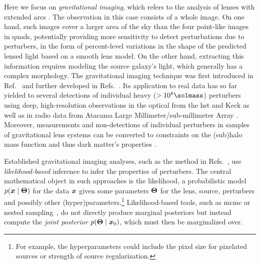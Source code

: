 Here we focus on \emph{gravitational imaging}, which refers to the analysis of lenses with extended arcs \cite{Koopmans:2005ig,Vegetti:2008eg,Vegetti:2009gw}. The observation in this case consists of a whole image. On one hand, such images cover a larger area of the sky than the four point-like images in quads, potentially providing more sensitivity to detect perturbations due to perturbers, in the form of percent-level variations in the shape of the predicted lensed light based on a smooth lens model. On the other hand, extracting this information requires modeling the source galaxy's light, which generally has a complex morphology. The gravitational imaging technique was first introduced in Ref.~\cite{Koopmans:2005nr} and further developed in Refs.~\cite{Vegetti:2008eg, Vegetti:2009gw}. Its application to real data has so far yielded to several detections of individual heavy ($>10^8 \si{\solmass}$) perturbers using deep, high-resolution observations in the optical from the \gls*{hst} and Keck as well as in radio data from Atacama Large Millimeter/sub-millimeter Array \cite{Vegetti:2010wa, Vegetti:2009cz, Vegetti:2012mc, Hezaveh:2016ltk,Diego:2022mii}. Moreover, measurements and non-detections of individual perturbers in samples of gravitational lens systems can be converted to constraints on the (sub)halo mass function and thus dark matter's properties \cite{Vegetti:2014lqa, Vegetti:2018dly,Ritondale:2018cvp}. 

Established gravitational imaging analyses, such as the method in Refs.~\cite{Vegetti:2008eg,Hezaveh:2016ltk}, use \emph{likelihood-based} inference to infer the properties of perturbers. The central mathematical object in such approaches is the likelihood, a probabilistic model $p(\bm{x} \mid \bm{\Theta})$ for the data $\bm{x}$ given some parameters $\bm{\Theta}$ for the lens, source, perturbers and possibly other (hyper)parameters.\footnote{For example, the hyperparameters could include the pixel size for pixelated sources or strength of source regularization.}   
Likelihood-based tools, such as \gls*{mcmc} or nested sampling~\cite{Skilling:2004pqw}, do not directly produce marginal posteriors but instead compute the \emph{joint posterior} $p(\bm{\Theta} \mid \bm{x}_0)$, which must then be marginalized over. 

